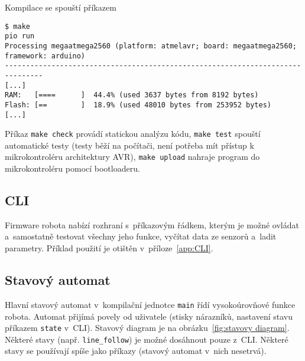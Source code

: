 \documentclass[a4paper,11pt]{article}
\begin{document}
Kompilace se spouští příkazem
\begin{lstlisting}[style=terminal]
$ make
pio run
Processing megaatmega2560 (platform: atmelavr; board: megaatmega2560; framework: arduino)
-------------------------------------------------------------------------------
[...]
RAM:   [====      ]  44.4% (used 3637 bytes from 8192 bytes)
Flash: [==        ]  18.9% (used 48010 bytes from 253952 bytes)
[...]
\end{lstlisting}
Příkaz \texttt{make check} provádí statickou analýzu kódu, \texttt{make test}
spouští automatické testy (testy běží na počítači, není potřeba mít přístup
k mikrokontroléru architektury AVR), \texttt{make upload} nahraje program do
mikrokontroléru pomocí bootloaderu.


\subsection{CLI}
Firmware robota nabízí rozhraní s~příkazovým řádkem, kterým je možné
ovládat a~samostatně testovat všechny jeho funkce, vyčítat data ze
senzorů a~ladit parametry. Příklad použití je otištěn
v~příloze~\ref{app:CLI}.


\subsection{Stavový automat}
Hlavní stavový automat v~kompilační jednotce \texttt{main} řídí vysokoúrovňové
funkce robota. Automat přijímá povely od uživatele (stisky nárazníků, nastavení
stavu příkazem \texttt{state} v~CLI). Stavový diagram je na
obrázku~\ref{fig:stavovy diagram}. Některé stavy (např. \texttt{line\_follow})
je možné dosáhnout pouze z~CLI. Některé stavy se používají spíše jako příkazy
(stavový automat v~nich nesetrvá).
\end{document}

